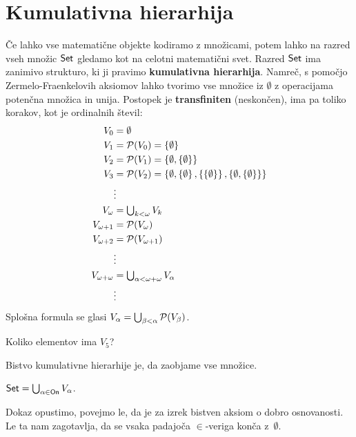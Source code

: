 \section{Kumulativna hierarhija}

Če lahko vse matematične objekte kodiramo z množicami, potem lahko na razred
vseh množic $\mathsf{Set}$ gledamo kot na celotni matematični svet. Razred $\mathsf{Set}$ ima
zanimivo strukturo, ki ji pravimo \textbf{kumulativna hierarhija}. Namreč, s pomočjo
Zermelo-Fraenkelovih aksiomov lahko tvorimo vse množice iz $\emptyset$ z
operacijama potenčna množica in unija. Postopek je \textbf{transfiniten} (neskončen), ima pa toliko korakov, kot je ordinalnih števil:
%
\begin{align*}
  V_0 &= \emptyset \\
  V_1 &= \mathcal{P}(V_0) = \left\{\emptyset\right\} \\
  V_2 &= \mathcal{P}(V_1) = \left\{\emptyset, \left\{\emptyset\right\}\right\} \\
  V_3 &= \mathcal{P}(V_2) = \left\{\emptyset, \left\{\emptyset\right\}, \left\{\left\{\emptyset\right\}\right\}, \left\{\emptyset, \left\{\emptyset\right\}\right\}\right\} \\
      &\vdots \\
  V_\omega &= \textstyle\bigcup_{k < \omega} V_k \\
  V_{\omega+1} &= \mathcal{P}(V_\omega) \\
  V_{\omega+2} &= \mathcal{P}(V_{\omega+1}) \\
  &\vdots \\
  V_{\omega + \omega} &= \textstyle\bigcup_{\alpha < \omega + \omega} V_\alpha \\
  &\vdots
\end{align*}
%
Splošna formula se glasi $V_\alpha = \textstyle\bigcup_{\beta < \alpha} \mathcal{P}(V_\beta)$.


\begin{vaja}
  Koliko elementov ima $V_5$?
\end{vaja}

Bistvo kumulativne hierarhije je, da zaobjame vse množice.

\begin{izrek}
  $\mathsf{Set} = \bigcup_{\alpha \in \mathsf{On}} V_\alpha$.
\end{izrek}

\begin{dokaz}
  Dokaz opustimo, povejmo le, da je za izrek bistven aksiom o dobro osnovanosti. Le ta nam zagotavlja, da se vsaka padajoča $\in$-veriga konča z~$\emptyset$.
\end{dokaz}


